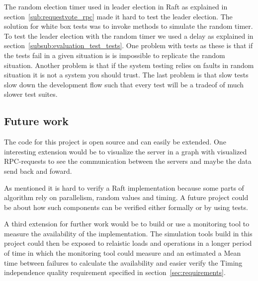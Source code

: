 The random election timer used in leader election in Raft as explained in section~\ref{sub:requestvote_rpc} made it hard to test the leader election. The solution for white box tests was to invoke methods to simulate the random timer. To test the leader election with the random timer we used a delay as explained in section~\ref{subsub:evaluation_test_tests}. One problem with tests as these is that if the tests fail in a given situation is is impossible to replicate the random situation. Another problem is that if the system testing relies on faults in random situation it is not a system you should trust. The last problem is that slow tests slow down the development flow such that every test will be a tradeof of much slower test suites.

\subsection{Future work}

The code for this project is open source and can easily be extended. One interesting extension would be to visualize the server in a graph with visualized RPC-requests to see the communication between the servers and maybe the data send back and foward.

As mentioned it is hard to verify a Raft implementation because some parts of algorithm rely on parallelism, random values and timing. A future project could be about how such components can be verified either formally or by using tests.

A third extension for further work would be to build or use a monitoring tool to measure the availability of the implementation. The simulation tools build in this project could then be exposed to relaistic loads and operations in a longer period of time in which the monitoring tool could measure and an estimated a Mean time between failures to calculate the availability and easier verify the Timing independence quality requirement specified in section~\ref{sec:requirements}.


